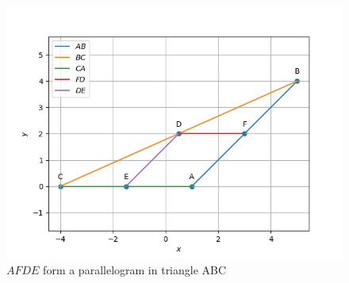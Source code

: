 \documentclass[11pt]{book}
\begin{document}
\begin{enumerate}[label=\thesection.\arabic*.,ref=\thesection.\theenumi]
\begin{figure}
\includegraphics[width=\columnwidth]{figs/tripara.jpg}
\caption{$AFDE$ form a parallelogram in triangle ABC}
\label{fig:Triangle}
\end{figure}
\end{enumerate}














%
\end{document}
